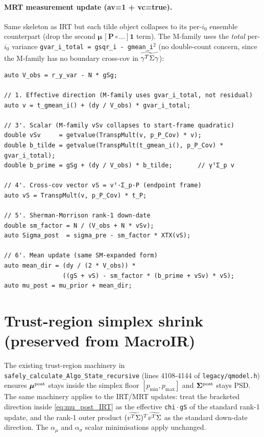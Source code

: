 \documentclass[11pt]{article}
\begin{document}
\paragraph{MRT measurement update (av=1 + vc=true).}
Same skeleton as IRT but each tilde object collapses to its per-$i_0$
ensemble counterpart (drop the second $\boldsymbol{\mu}\,[\mathbf{P}\!\circ\!\dots]\mathbf{1}$ term).
The M-family uses the \emph{total} per-$i_0$ variance
\texttt{gvar\_i\_total = gsqr\_i - gmean\_i\(^2\)} (no double-count concern,
since the M-family has no boundary cross-cov in $\widetilde{\gamma^{T}\Sigma\gamma}$):
\begin{verbatim}
auto V_obs = r_y_var - N * gSg;

// 1. Effective direction (M-family uses gvar_i_total, not residual)
auto v = t_gmean_i() + (dy / V_obs) * gvar_i_total;

// 3'. Scalar (M-family vSv collapses to start-frame quadratic)
double vSv     = getvalue(TranspMult(v, p_P_Cov) * v);
double b_tilde = getvalue(TranspMult(t_gmean_i(), p_P_Cov) * gvar_i_total);
double b_prime = gSg + (dy / V_obs) * b_tilde;       // γᵀΣ_p v

// 4'. Cross-cov vector vS = vᵀ·Σ_p·P (endpoint frame)
auto vS = TranspMult(v, p_P_Cov) * t_P;

// 5'. Sherman-Morrison rank-1 down-date
double sm_factor = N / (V_obs + N * vSv);
auto Sigma_post  = sigma_pre - sm_factor * XTX(vS);

// 6'. Mean update (same SM-expanded form)
auto mean_dir = (dy / (2 * V_obs)) *
                ((gS + vS) - sm_factor * (b_prime + vSv) * vS);
auto mu_post = mu_prior + mean_dir;
\end{verbatim}

\section{Trust-region simplex shrink (preserved from MacroIR)}

The existing trust-region machinery in
\texttt{safely\_calculate\_Algo\_State\_recursive} (lines 4108-4144 of
\texttt{legacy/qmodel.h}) ensures $\boldsymbol{\mu}^{\mathrm{post}}$ stays inside the simplex floor
$[p_{\min},p_{\max}]$ and $\boldsymbol{\Sigma}^{\mathrm{post}}$ stays PSD. The same machinery applies to
the IRT/MRT updates: treat the bracketed direction inside
\eqref{eq:mu_post_IRT} as the effective \texttt{chi}\,$\cdot$\,\texttt{gS} of the
standard rank-1 update, and the rank-1 outer product
$(\widetilde{v^{T}\Sigma})^{T}\widetilde{v^{T}\Sigma}$ as the standard down-date direction. The
$\alpha_\mu$ and $\alpha_\sigma$ scalar minimisations apply unchanged.
\end{document}
